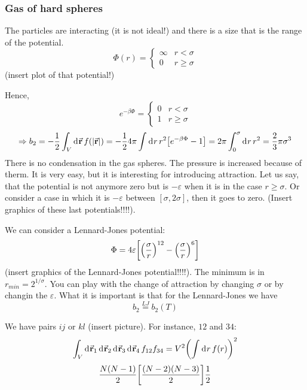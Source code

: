 \documentclass[../main/main.tex]{subfiles}
\begin{document}
\subsubsection{Gas of hard spheres}
The particles are interacting (it is not ideal!) and there is a size that is the range of the potential.
\begin{equation}
  \Phi (r) = \begin{cases}
    \infty & r < \sigma \\
    0     & r \ge \sigma
\end{cases}
\end{equation}
(insert plot of that potential!)

Hence,
\begin{equation}
  e^{-\beta \Phi } = \begin{cases}
    0 & r < \sigma\\
    1 & r \ge \sigma
  \end{cases}
\end{equation}
\begin{equation}
  \Rightarrow b_2 = - \frac{1}{2} \int_{V}^{} \dd[]{\va{r}}  f \qty(\abs{\va{r}} )
  = - \frac{1}{2} 4 \pi \int_{}^{} \dd[]{r} r^2 \qty[e^{-\beta \Phi }-1 ]
  = 2 \pi \int_{0}^{\sigma } \dd[]{r} r^2 = \frac{2}{3} \pi  \sigma ^3
\end{equation}
There is no condensation in the gas spheres.
The pressure is increased because of therm.
It is very easy, but it is interesting for introducing attraction.
Let us say, that the potential is not anymore zero but is \( - \varepsilon  \) when it is in the case \( r \ge \sigma \). Or consider a case in which it is \( - \varepsilon  \) between \( [\sigma ,2 \sigma ] \), then it goes to zero. (Insert graphics of these last potentials!!!!).

We can consider a Lennard-Jones potential:
\begin{equation}
  \Phi = 4 \varepsilon \qty[\qty(\frac{\sigma }{r})^{12} - \qty(\frac{\sigma }{r})^6  ]
\end{equation}
(insert graphics of the Lennard-Jones potential!!!!). The minimum is in \( r_{min}=2^{1/\sigma } \). You can play with the change of attraction by changing \( \sigma  \) or by changin the   \( \varepsilon  \).
What it is important is that for the Lennard-Jones we have
\begin{equation}
  b_2 \overset{LJ}{=} b_2 (T)
\end{equation}

We have pairs \( ij \) or \( kl \) (insert picture).   For instance, \( 12 \) and \( 34 \):
\begin{equation}
  \int_{V}^{} \dd[]{\va{r}_1}  \dd[]{\va{r}_2}   \dd[]{\va{r}_3}   \dd[]{\va{r}_4} f_{12} f_{34}
  = V^2 \qty(  \int_{}^{} \dd[]{r} f(r)  )^2
\end{equation}
\begin{equation}
  \frac{N(N-1)}{2} \qty[\frac{(N-2)(N-3)}{2}] \frac{1}{2}
\end{equation}
\end{document}
